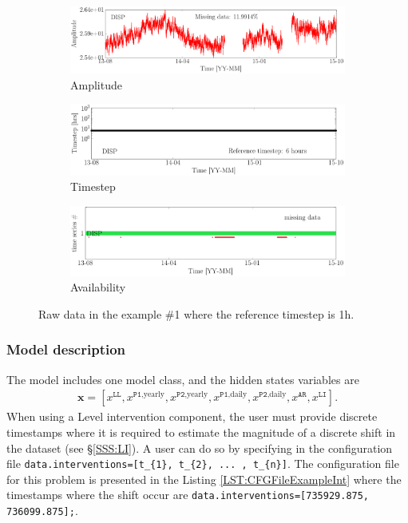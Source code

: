 \begin{figure}[h]
\centering
\begin{subfigure}{\linewidth}
\includegraphics[width=0.95\linewidth]{./docfigs/Example_DISP_INTERVENTION/ALL_AMPLITUDES.pdf}
\caption{Amplitude}
\end{subfigure}
\begin{subfigure}{\linewidth}
\centering
\includegraphics[width=0.9\linewidth]{./docfigs/Example_DISP_INTERVENTION/ALL_TIMESTEPS.pdf} 
\caption{Timestep}
\end{subfigure}
\begin{subfigure}{\linewidth}
\centering
\includegraphics[width=0.9\linewidth]{./docfigs/Example_DISP_INTERVENTION/AVAILABILITY.pdf}
\caption{Availability}
\end{subfigure}
\caption{Raw data in the example \#1 where the reference timestep is 1h.}
\label{fig:DataSummary1}
\end{figure}


\subsubsection{Model description}
\label{SS:ModelConstructionExample1}
The model includes one model class, and the hidden states variables are 
\begin{gather*}
\textbf{x}=[x^{\mathtt{LL}}, x^{\mathtt{P1}\text{,yearly}}, x^{\mathtt{P2}\text{,yearly}}, x^{\mathtt{P1}\text{,daily}}, x^{\mathtt{P2}\text{,daily}}, x^{\mathtt{AR}}, x^{\mathtt{LI}}].
\end{gather*}
When using a Level intervention component, the user must provide discrete timestamps where it is required to estimate the magnitude of a discrete shift in the dataset (see \S\ref{SSS:LI}). A user can do so by specifying in the configuration file \colorbox{light-gray}{\lstinline[basicstyle = \mlttfamily \small, backgroundcolor = \color{light-gray}]!data.interventions=[t_{1}, t_{2}, ... , t_{n}]!}. The configuration file for this problem is presented in the Listing \ref{LST:CFGFileExampleInt} where the timestamps where the shift occur are \colorbox{light-gray}{\lstinline[basicstyle = \mlttfamily \small, backgroundcolor = \color{light-gray}]!data.interventions=[735929.875, 736099.875];!}. 

